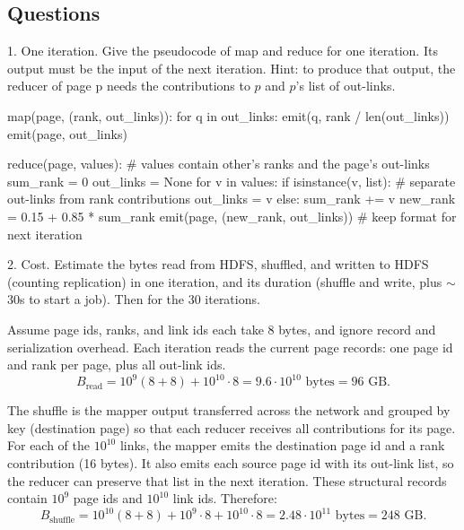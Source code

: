 \documentclass[11pt,a4paper]{article}
\begin{document}
\subsection*{Questions}

\begin{tcolorbox}[colback=gray!20,colframe=gray!20, sharp corners]
1. One iteration. Give the pseudocode of map and reduce for one iteration. Its output must be the input of the next iteration. Hint: to produce that output, the reducer of page p needs the contributions to $p$ and $p$'s list of out-links. 
\end{tcolorbox}

\begin{rcode}
    map(page, (rank, out_links)):
        for q in out_links:
            emit(q, rank / len(out_links))
        emit(page, out_links)

    reduce(page, values): # values contain other's ranks and the page's out-links
        sum_rank = 0
        out_links = None
        for v in values:
            if isinstance(v, list): # separate out-links from rank contributions
                out_links = v
            else:
                sum_rank += v
        new_rank = 0.15 + 0.85 * sum_rank
        emit(page, (new_rank, out_links)) # keep format for next iteration
\end{rcode}

\newpage

\begin{tcolorbox}[colback=gray!20,colframe=gray!20, sharp corners]
2. Cost. Estimate the bytes read from HDFS, shuffled, and written to HDFS (counting replication) in one iteration, and its duration (shuffle and write, plus $\sim$ 30s to start a job). Then for the 30 iterations.
\end{tcolorbox}

Assume page ids, ranks, and link ids each take 8 bytes, and ignore record and serialization overhead. Each iteration reads the current page records: one page id and rank per page, plus all out-link ids.
\begin{equation*}
    B_{\text{read}} = 10^9(8+8) + 10^{10}\cdot 8
    = 9.6\cdot10^{10}\text{ bytes} = 96\text{ GB}.
\end{equation*}

The shuffle is the mapper output transferred across the network and grouped by key (destination page) so that each reducer receives all contributions for its page. For each of the $10^{10}$ links, the mapper emits the destination page id and a rank contribution (16 bytes). It also emits each source page id with its out-link list, so the reducer can preserve that list in the next iteration. These structural records contain $10^9$ page ids and $10^{10}$ link ids. Therefore:
\begin{equation*}
    B_{\text{shuffle}} = 10^{10}(8+8) + 10^9\cdot8 + 10^{10}\cdot8
    = 2.48\cdot10^{11}\text{ bytes} = 248\text{ GB}.
\end{equation*}
\end{document}
